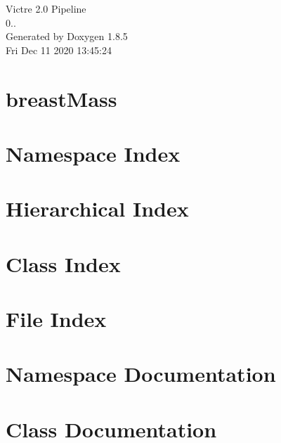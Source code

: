 \documentclass[twoside]{book}
\newcommand{\clearemptydoublepage}{%
  \newpage{\pagestyle{empty}\cleardoublepage}%
}
\begin{document}
\hypersetup{pageanchor=false}
\begin{titlepage}
\vspace*{7cm}
\begin{center}%
{\Large Victre 2.0 Pipeline \\[1ex]\large 0.. }\\
\vspace*{1cm}
{\large Generated by Doxygen 1.8.5}\\
\vspace*{0.5cm}
{\small Fri Dec 11 2020 13:45:24}\\
\end{center}
\end{titlepage}
\clearemptydoublepage
\tableofcontents
\clearemptydoublepage
{}
\hypersetup{pageanchor=true}

\chapter{breast\-Mass}
\label{md_Victre_breastMass_README}
\hypertarget{md_Victre_breastMass_README}{}

\chapter{Namespace Index}

\chapter{Hierarchical Index}

\chapter{Class Index}

\chapter{File Index}

\chapter{Namespace Documentation}










\chapter{Class Documentation}



\end{document}
